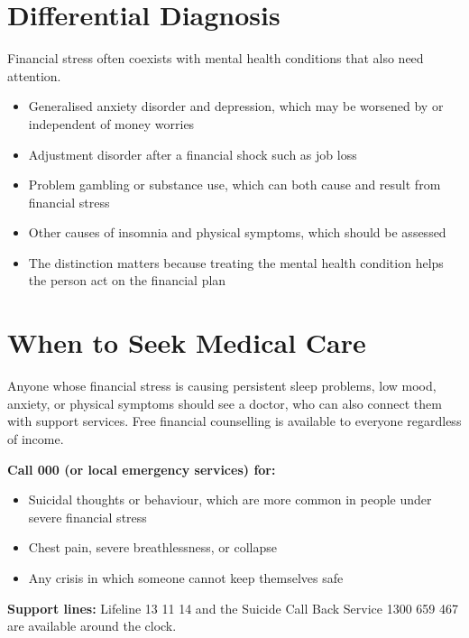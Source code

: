 \section*{Differential Diagnosis}
Financial stress often coexists with mental health conditions that also need attention.
\begin{itemize}
    \item Generalised anxiety disorder and depression, which may be worsened by or independent of money worries
    \item Adjustment disorder after a financial shock such as job loss
    \item Problem gambling or substance use, which can both cause and result from financial stress
    \item Other causes of insomnia and physical symptoms, which should be assessed
    \item The distinction matters because treating the mental health condition helps the person act on the financial plan
\end{itemize}

\section*{When to Seek Medical Care}
Anyone whose financial stress is causing persistent sleep problems, low mood, anxiety, or physical symptoms should see a doctor, who can also connect them with support services. Free financial counselling is available to everyone regardless of income.

\textbf{Call 000 (or local emergency services) for:}
\begin{itemize}
    \item Suicidal thoughts or behaviour, which are more common in people under severe financial stress
    \item Chest pain, severe breathlessness, or collapse
    \item Any crisis in which someone cannot keep themselves safe
\end{itemize}

\textbf{Support lines:} Lifeline 13 11 14 and the Suicide Call Back Service 1300 659 467 are available around the clock.

